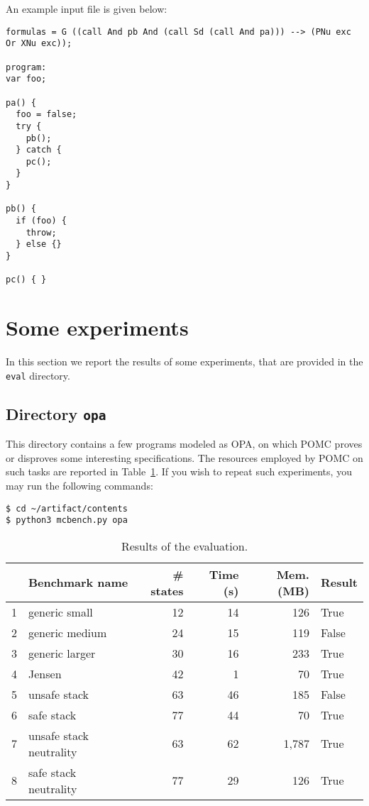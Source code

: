 \documentclass{article}
\begin{document}
An example input file is given below:
\begin{verbatim}
formulas = G ((call And pb And (call Sd (call And pa))) --> (PNu exc Or XNu exc));

program:
var foo;

pa() {
  foo = false;
  try {
    pb();
  } catch {
    pc();
  }
}

pb() {
  if (foo) {
    throw;
  } else {}
}

pc() { }
\end{verbatim}


\clearpage

\section{Some experiments}
\label{sec:exp}

In this section we report the results of some experiments, that
are provided in the \texttt{eval} directory.


\subsection{Directory \texttt{opa}}

This directory contains a few programs modeled as OPA,
on which POMC proves or disproves some interesting specifications.
The resources employed by POMC on such tasks are reported in Table~\ref{tab:eval}.
If you wish to repeat such experiments, you may run the following
commands:
\begin{verbatim}
$ cd ~/artifact/contents
$ python3 mcbench.py opa
\end{verbatim}

\begin{table}[b]
  \centering
  \begin{tabular}{| r | l | r | r | r | l |}
    \hline
    & Benchmark name & \# states & Time (s) & Mem. (MB) & Result \\
    \hline
    1 & generic small & 12 & 14 & 126 & True \\
    2 & generic medium & 24 & 15 & 119 & False \\
    3 & generic larger & 30 & 16 & 233 & True \\
    4 & Jensen & 42 & 1 & 70 & True \\
    5 & unsafe stack & 63 & 46 & 185 & False \\
    6 & safe stack & 77 & 44 & 70 & True \\
    7 & unsafe stack neutrality & 63 & 62 & 1,787 & True \\
    8 & safe stack neutrality & 77 & 29 & 126 & True \\
    \hline
  \end{tabular}
  \caption{Results of the evaluation.}
  \label{tab:eval}
\end{table}
\end{document}
